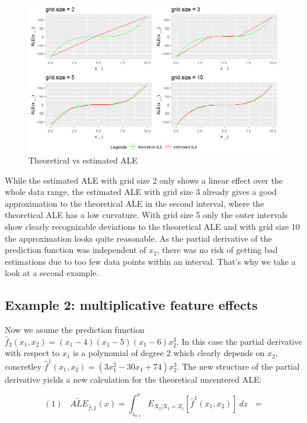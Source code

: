 \documentclass[
]{krantz}
\begin{document}
\begin{figure}
\includegraphics[width=1\linewidth]{images/ALE_2_example1_} \caption{Theoretical vs estimated ALE}\label{fig:exampleALE1}
\end{figure}



While the estimated ALE with grid size 2 only shows a linear effect over the whole data range, the estimated ALE with grid size 3 already gives a good approximation to the theoretical ALE in the second interval, where the theoretical ALE has a low curvature. With grid size 5 only the outer intervals show clearly recognizable deviations to the theoretical ALE and with grid size 10 the approximation looks quite reasonable.
As the partial derivative of the prediction function was independent of \(x_2\), there was no risk of getting bad estimations due to too few data points within an interval. That's why we take a look at a second example.

\hypertarget{example-2-multiplicative-feature-effects}{%
\subsection{Example 2: multiplicative feature effects}\label{example-2-multiplicative-feature-effects}}

Now we asume the prediction function \(\hat{f}_2 (x_1, x_2) = (x_1-4)(x_1-5)(x_1-6)x_2^3\). In this case the partial derivative with respect to \(x_1\) is a polynomial of degree 2 which clearly depends on \(x_2\), concretley \(\hat{f}^1(x_1,x_2) = (3x_1^2 -30x_1 +74)x_2^3\). The new structure of the partial derivative yields a new calculation for the theoretical uncentered ALE:

\[(1)~~~~\widetilde{ALE}_{\hat{f},1}(x) = \int_{z_{0,1}}^x E_{X_2\vert X_1= Z_1}[\hat{f}^1(x_1,x_2)]~dz~~~=\]
\end{document}
